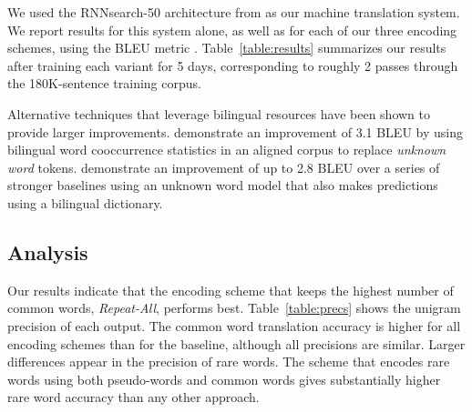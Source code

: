 We used the RNNsearch-50 architecture from 
as our machine translation system. We report results for this system alone, as
well as for each of our three encoding schemes, using the BLEU metric
\cite{bleu}. Table~\ref{table:results} summarizes our results after training
each variant for 5 days, corresponding to roughly 2 passes through the
180K-sentence training corpus.

Alternative techniques that leverage bilingual resources have been shown to
provide larger improvements.  demonstrate an
improvement of 3.1 BLEU by using bilingual word cooccurrence statistics in an
aligned corpus to replace \emph{unknown word} tokens.
 demonstrate an improvement of up to 2.8
BLEU over a series of stronger baselines using an unknown word model that
also makes predictions using a bilingual dictionary.

\subsection{Analysis}

\begin{table}
  \centering
  \vspace{8pt}
  \caption{Test set precision (\%) on common words and rare words for each
  encoding strategy. \emph{1st Symbol} denotes the precision of the first
  pseudo-word symbol in an encoded rare word.}
  \label{table:precs}
\end{table}

Our results indicate that the encoding scheme that keeps the highest number of
common words, \emph{Repeat-All}, performs best. Table~\ref{table:precs} shows
the unigram precision of each output. The common word translation accuracy is
higher for all encoding schemes than for the baseline, although all precisions
are similar. Larger differences appear in the precision of rare words. The
scheme that encodes rare words using both pseudo-words and common words gives
substantially higher rare word accuracy than any other approach.

